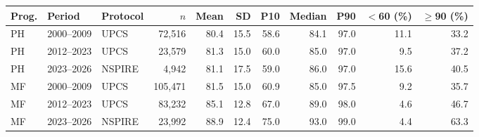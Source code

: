 \begin{tabular}{lllrrrrrrrr}
\toprule
Prog. & Period & Protocol & $n$ & Mean & SD & P10 & Median & P90 & $<$60 (\%) & $\geq$90 (\%) \\
\midrule
PH & 2000--2009 & UPCS & 72,516 & 80.4 & 15.5 & 58.6 & 84.1 & 97.0 & 11.1 & 33.2 \\
PH & 2012--2023 & UPCS & 23,579 & 81.3 & 15.0 & 60.0 & 85.0 & 97.0 & 9.5 & 37.2 \\
PH & 2023--2026 & NSPIRE & 4,942 & 81.1 & 17.5 & 59.0 & 86.0 & 97.0 & 15.6 & 40.5 \\
MF & 2000--2009 & UPCS & 105,471 & 81.5 & 15.0 & 60.9 & 85.0 & 97.5 & 9.2 & 35.7 \\
MF & 2012--2023 & UPCS & 83,232 & 85.1 & 12.8 & 67.0 & 89.0 & 98.0 & 4.6 & 46.7 \\
MF & 2023--2026 & NSPIRE & 23,992 & 88.9 & 12.4 & 75.0 & 93.0 & 99.0 & 4.4 & 63.3 \\
\bottomrule
\end{tabular}
